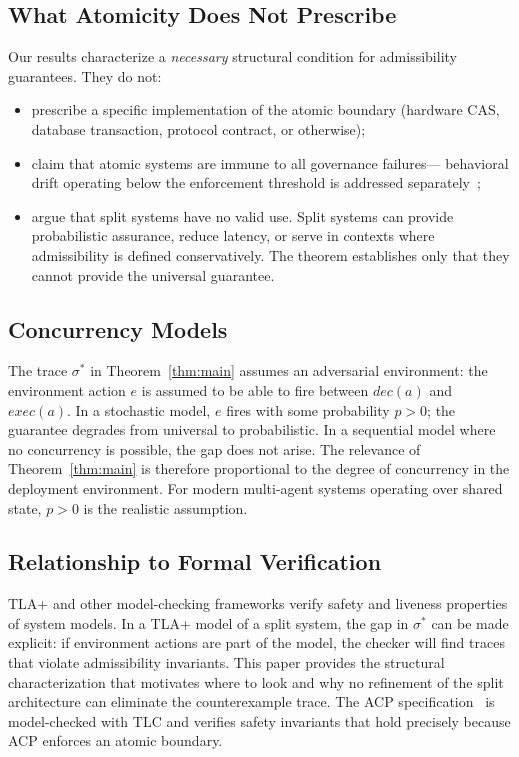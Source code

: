 \documentclass[11pt]{article}
\theoremstyle{plain}
\theoremstyle{definition}
\theoremstyle{remark}
\begin{document}
\subsection{What Atomicity Does Not Prescribe}

Our results characterize a \emph{necessary} structural condition for
admissibility guarantees.  They do not:
\begin{itemize}
  \item prescribe a specific implementation of the atomic boundary (hardware
    CAS, database transaction, protocol contract, or otherwise);
  \item claim that atomic systems are immune to all governance failures---
    behavioral drift operating below the enforcement threshold is addressed
    separately~\cite{iml26};
  \item argue that split systems have no valid use.  Split systems can
    provide probabilistic assurance, reduce latency, or serve in contexts
    where admissibility is defined conservatively.  The theorem establishes
    only that they cannot provide the universal guarantee.
\end{itemize}

\subsection{Concurrency Models}

The trace $\sigma^*$ in Theorem~\ref{thm:main} assumes an adversarial
environment: the environment action $e$ is assumed to be able to fire between
$\mathit{dec}(a)$ and $\mathit{exec}(a)$.  In a stochastic model, $e$ fires
with some probability $p > 0$; the guarantee degrades from universal to
probabilistic.  In a sequential model where no concurrency is possible, the
gap does not arise.  The relevance of Theorem~\ref{thm:main} is therefore
proportional to the degree of concurrency in the deployment environment.  For
modern multi-agent systems operating over shared state, $p > 0$ is the
realistic assumption.

\subsection{Relationship to Formal Verification}

TLA+ and other model-checking frameworks verify safety and liveness properties
of system models.  In a TLA+ model of a split system, the gap in $\sigma^*$
can be made explicit: if environment actions are part of the model, the
checker will find traces that violate admissibility invariants.  This paper
provides the structural characterization that motivates where to look and why
no refinement of the split architecture can eliminate the counterexample trace.
The ACP specification~\cite{acp26} is model-checked with TLC and verifies
safety invariants that hold precisely because ACP enforces an atomic boundary.
\end{document}
